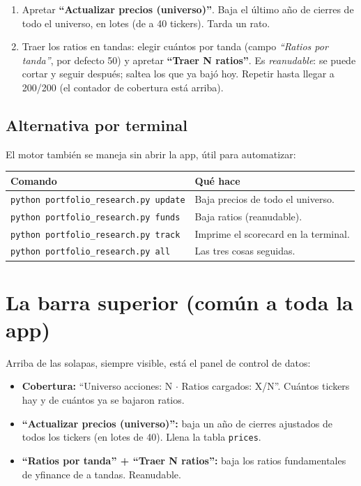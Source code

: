 \documentclass[11pt,a4paper]{article}
\newcommand{\code}[1]{\texttt{#1}}
\begin{document}
\begin{enumerate}[leftmargin=1.4em]
  \item Apretar \textbf{``Actualizar precios (universo)''}. Baja el \'ultimo a\~no de
  cierres de todo el universo, en lotes (de a 40 tickers). Tarda un rato.
  \item Traer los ratios en tandas: elegir cu\'antos por tanda (campo \emph{``Ratios
  por tanda''}, por defecto 50) y apretar \textbf{``Traer N ratios''}. Es
  \emph{reanudable}: se puede cortar y seguir despu\'es; saltea los que ya baj\'o hoy.
  Repetir hasta llegar a 200/200 (el contador de cobertura est\'a arriba).
\end{enumerate}

\subsection{Alternativa por terminal}

El motor tambi\'en se maneja sin abrir la app, \'util para automatizar:

\begin{longtable}{L{6.2cm} L{8.1cm}}
\toprule
\textbf{Comando} & \textbf{Qu\'e hace} \\
\midrule
\endhead
\code{python portfolio\_research.py update} & Baja precios de todo el universo. \\
\code{python portfolio\_research.py funds} & Baja ratios (reanudable). \\
\code{python portfolio\_research.py track} & Imprime el scorecard en la terminal. \\
\code{python portfolio\_research.py all} & Las tres cosas seguidas. \\
\bottomrule
\end{longtable}

\section{La barra superior (com\'un a toda la app)}

Arriba de las solapas, siempre visible, est\'a el panel de control de datos:

\begin{itemize}[leftmargin=1.4em]
  \item \textbf{Cobertura:} ``Universo acciones: N $\cdot$ Ratios cargados: X/N''.
  Cu\'antos tickers hay y de cu\'antos ya se bajaron ratios.
  \item \textbf{\rmfamily ``Actualizar precios (universo)'':} baja un a\~no de cierres
  ajustados de todos los tickers (en lotes de 40). Llena la tabla \code{prices}.
  \item \textbf{``Ratios por tanda'' + ``Traer N ratios'':} baja los ratios
  fundamentales de yfinance de a tandas. Reanudable.
\end{itemize}
\end{document}
